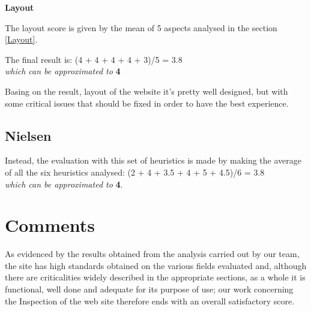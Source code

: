 \par\medskip
\pagebreak
\textbf{Layout}\par
The layout score is given by the mean of 5 aspects analysed in the section \ref{Layout}. \par
The final result is: 
(4 + 4 + 4 + 4 + 3)/5 = 3.8 \\
\textit{which can be approximated to} \textbf{4}\par
Basing on the result, layout of the website it's pretty well designed, but with some critical issues that should be fixed in order to have the best experience.

\begin{figure}[H]
  \centering
\end{figure}


\subsection{Nielsen}
Instead, the evaluation with this set of heuristics is made by making the average of all the six heuristics analysed:
(2 + 4 + 3.5 + 4 + 5 + 4.5)/6 = 3.8 \\
\textit{which can be approximated to} \textbf{4}.\par

\begin{figure}[H]
  \centering
\end{figure}

\section{Comments}
As evidenced by the results obtained from the analysis carried out by our team, the site has high standards obtained on the various fields evaluated and, although there are criticalities widely described in the appropriate sections, as a whole it is functional, well done and adequate for its purpose of use; our work concerning the Inspection of the web site therefore ends with an overall satisfactory score.
